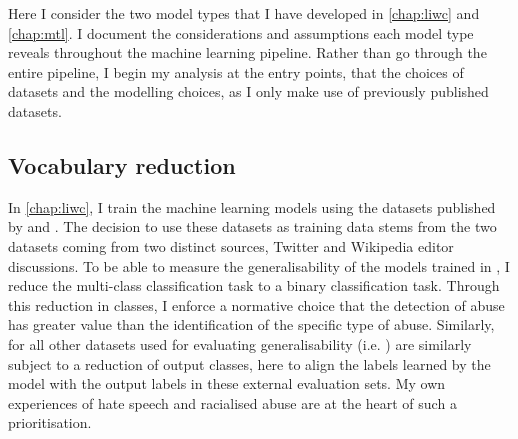 Here I consider the two model types that I have developed in \autoref{chap:liwc} and \autoref{chap:mtl}. I document the considerations and assumptions each model type reveals throughout the machine learning pipeline. Rather than go through the entire pipeline, I begin my analysis at the entry points, that the choices of datasets and the modelling choices, as I only make use of previously published datasets.

\subsection{Vocabulary reduction}\label{sub:vocab_redux}

In \autoref{chap:liwc}, I train the machine learning models using the datasets published by \citet{Davidson:2017} and \citet{Wulczyn:2016}. The decision to use these datasets as training data stems from the two datasets coming from two distinct sources, Twitter and Wikipedia editor discussions.
To be able to measure the generalisability of the models trained in \citet{Davidson:2017}, I reduce the multi-class classification task to a binary classification task. Through this reduction in classes, I enforce a normative choice that the detection of abuse has greater value than the identification of the specific type of abuse. Similarly, for all other datasets used for evaluating generalisability (i.e. \citet{Waseem:2016,Waseem-Hovy:2016,Gibert:2018}) are similarly subject to a reduction of output classes, here to align the labels learned by the model with the output labels in these external evaluation sets. My own experiences of hate speech and racialised abuse are at the heart of such a prioritisation.
